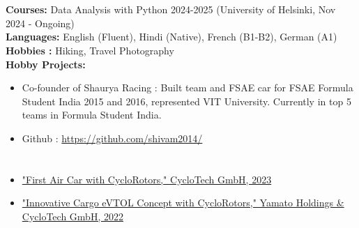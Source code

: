 \documentclass[9pt]{article}        %
\begin{document}
\section*{{\fontsize{12}{14.4}\selectfont{}}{\fontsize{9}{10.8}\selectfont{}}}
\textbf{Courses:} Data Analysis with Python 2024-2025 (University of Helsinki, Nov 2024 - Ongoing) \\
\textbf{Languages:} English (Fluent), Hindi (Native), French (B1-B2), German (A1) \\
\textbf{Hobbies :} Hiking, Travel Photography \\
\textbf{Hobby Projects:} \\
\vspace{-6 pt} %
\begin{itemize}
  \item Co-founder of Shaurya Racing : Built team and FSAE car for FSAE Formula Student India 2015 and 2016, represented VIT University. Currently in top 5 teams in Formula Student India.
  \item Github : \href{https://github.com/shivam2014/}{https://github.com/shivam2014/}

\end{itemize}

\section*{{\fontsize{12}{14.4}\selectfont{}}{\fontsize{9}{10.8}\selectfont{}}}
\begin{itemize}
  \item \href{http://www.cyclotech.at/download/2005/}{"First Air Car with CycloRotors," CycloTech GmbH, 2023}
  \item \href{https://www.cyclotech.at/cyclotech-presents-first-air-car-with-cyclorotors/}{"Innovative Cargo eVTOL Concept with CycloRotors," Yamato Holdings \& CycloTech GmbH, 2022}
\end{itemize}
\end{document}
